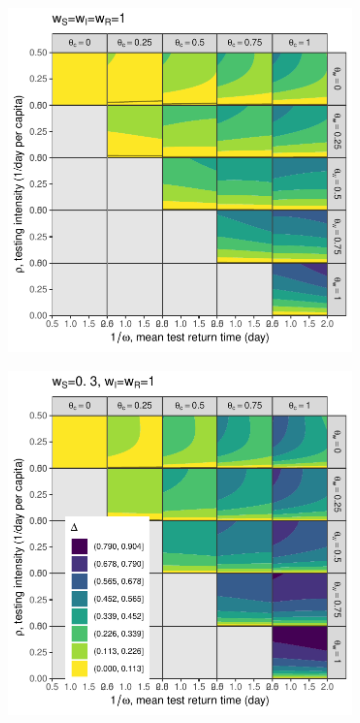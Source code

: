 \documentclass[12pt]{article}
\DeclareRobustCommand\_{\ifmmode\expandafter\subtxt\else\textunderscore\fi}
\theoremstyle{definition} %
\begin{document}
\begin{figure}[h!]
\centering
\begin{subfigure}[t]{.45\textwidth}
\centering
\includegraphics[width=\linewidth]{codes/R0contour_random_rho.5.pdf}
\caption{}
\end{subfigure}
%
\begin{subfigure}[t]{.45\textwidth}
\centering
\includegraphics[width=\linewidth]{codes/R0contour_TTI_rho.5.pdf}

\end{subfigure}
\end{figure}
\end{document}
